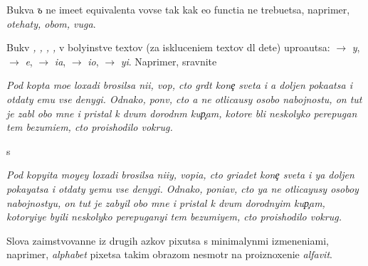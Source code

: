 \documentclass[10pt]{article}
\begin{document}
\noindent
Bukva \textit{ъ} ne ime{\y}et equivalenta vovse tak kak {\y}e{\y}o functi{\y}a ne trebu{\y}etsa,
naprimer, \textit{ot{\y}ehaty, ob{\y}om, v{\y}uga}.

Bukv{\yi} \textit{{\y}, {\e}, {\ia}, {\io}, {\yi}} v boly{\x}instve textov (za iskluceni{\y}em
textov dl{\ia} dete{\y}) upro{\x}a{\y}utsa:
    \textit{{\y}}  $\rightarrow$ \textit{y},
    \textit{{\e}}  $\rightarrow$ \textit{e},
    \textit{{\ia}} $\rightarrow$ \textit{ia},
    \textit{{\io}} $\rightarrow$ \textit{io},
    \textit{{\yi}} $\rightarrow$ \textit{yi}.
Naprimer, sravnite

\textit{
    Pod kop{\yi}ta mo{\y}e{\y} loxadi brosilsa ni{\x}i{\y}, vop{\ia}, cto gr{\ia}d{\e}t kone{\c} sveta i {\y}a doljen poka{\y}atsa i otdaty {\y}emu vse denygi. Odnako, pon{\ia}v, cto {\y}a ne otlica{\y}usy osobo{\y} nabojnost{\y}u, on tut je zab{\yi}l obo mne i pristal k dvum dorodn{\yi}m kup{\c}am, kotor{\yi}{\y}e b{\yi}li neskolyko perepugan{\yi} tem bezumi{\y}em, cto proishodilo vokrug.
}

\noindent s

\textit{
    Pod kopyita moyey loxadi brosilsa ni{\x}iy, vopia, cto griadet kone{\c} sveta i ya doljen pokayatsa i otdaty yemu vse denygi. Odnako, poniav, cto ya ne otlicayusy osoboy nabojnostyu, on tut je zabyil obo mne i pristal k dvum dorodnyim kup{\c}am, kotoryiye byili neskolyko perepuganyi tem bezumiyem, cto proishodilo vokrug.
}

Slova zaimstvovann{\yi}{\y}e iz drugih {\y}az{\yi}kov pixutsa s minimalyn{\yi}mi izmeneni{\y}ami, 
naprimer, \textit{alphabet} pixetsa takim obrazom nesmotr{\ia} na proiznoxeni{\y}e \textit{alfavit}.


\end{document}
